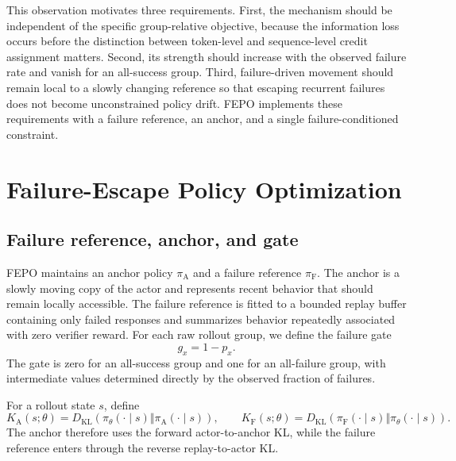 \documentclass{article}
\newcommand{\pol}{\pi_\theta}
\newcommand{\anchorpol}{\pi_{\mathrm A}}
\newcommand{\failpol}{\pi_{\mathrm F}}
\newcommand{\KL}{D_{\mathrm{KL}}}
\newcommand{\FEPO}{\textsc{FEPO}\xspace}
\begin{document}
This observation motivates three requirements. First, the mechanism should be independent of the specific group-relative objective, because the information loss occurs before the distinction between token-level and sequence-level credit assignment matters. Second, its strength should increase with the observed failure rate and vanish for an all-success group. Third, failure-driven movement should remain local to a slowly changing reference so that escaping recurrent failures does not become unconstrained policy drift. \FEPO implements these requirements with a failure reference, an anchor, and a single failure-conditioned constraint.

\section{Failure-Escape Policy Optimization}
\label{sec:fepo}

\subsection{Failure reference, anchor, and gate}
\FEPO maintains an anchor policy $\anchorpol$ and a failure reference $\failpol$. The anchor is a slowly moving copy of the actor and represents recent behavior that should remain locally accessible. The failure reference is fitted to a bounded replay buffer containing only failed responses and summarizes behavior repeatedly associated with zero verifier reward. For each raw rollout group, we define the failure gate
\begin{equation}
g_x=1-p_x.
\label{eq:failure_gate}
\end{equation}
The gate is zero for an all-success group and one for an all-failure group, with intermediate values determined directly by the observed fraction of failures.

For a rollout state $s$, define
\begin{equation}
K_{\mathrm A}(s;\theta)=\KL\!\left(\pol(\cdot\mid s)\Vert\anchorpol(\cdot\mid s)\right),
\qquad
K_{\mathrm F}(s;\theta)=\KL\!\left(\failpol(\cdot\mid s)\Vert\pol(\cdot\mid s)\right).
\label{eq:state_kls}
\end{equation}
The anchor therefore uses the forward actor-to-anchor KL, while the failure reference enters through the reverse replay-to-actor KL.
\end{document}
